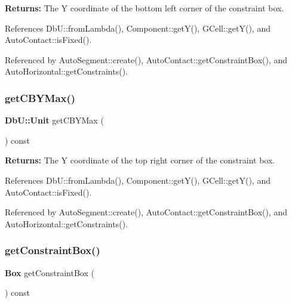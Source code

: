{\bfseries Returns\+:} The Y coordinate of the bottom left corner of the constraint box. 

References Db\+U\+::from\+Lambda(), Component\+::get\+Y(), G\+Cell\+::get\+Y(), and Auto\+Contact\+::is\+Fixed().



Referenced by Auto\+Segment\+::create(), Auto\+Contact\+::get\+Constraint\+Box(), and Auto\+Horizontal\+::get\+Constraints().

\mbox{\label{classKatabatic_1_1AutoContact_a4e4061a17285b0c08c31cfee65947cb6}} 
\subsubsection{\texorpdfstring{get\+C\+B\+Y\+Max()}{getCBYMax()}}
{\footnotesize\ttfamily \textbf{ Db\+U\+::\+Unit} get\+C\+B\+Y\+Max (\begin{DoxyParamCaption}{ }\end{DoxyParamCaption}) const\hspace{0.3cm}{\ttfamily [inline]}}

{\bfseries Returns\+:} The Y coordinate of the top right corner of the constraint box. 

References Db\+U\+::from\+Lambda(), Component\+::get\+Y(), G\+Cell\+::get\+Y(), and Auto\+Contact\+::is\+Fixed().



Referenced by Auto\+Segment\+::create(), Auto\+Contact\+::get\+Constraint\+Box(), and Auto\+Horizontal\+::get\+Constraints().

\mbox{\label{classKatabatic_1_1AutoContact_ae9d087a6cd3d459d7f4bea6bc8b08b49}} 
\subsubsection{\texorpdfstring{get\+Constraint\+Box()}{getConstraintBox()}}
{\footnotesize\ttfamily \textbf{ Box} get\+Constraint\+Box (\begin{DoxyParamCaption}{ }\end{DoxyParamCaption}) const\hspace{0.3cm}{\ttfamily [inline]}}

